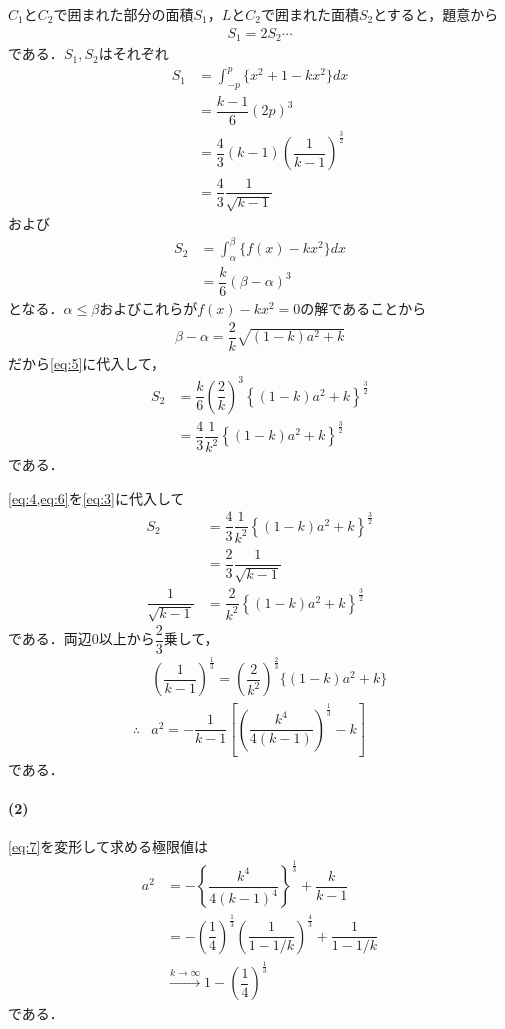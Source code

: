 \documentclass[../../main.tex]{subfiles}
\begin{document}
$C_1$と$C_2$で囲まれた部分の面積$S_1$，$L$と$C_2$で囲まれた面積$S_2$とすると，題意から
\begin{align}
  S_1 = 2S_2 \cdots \label{eq:3}
\end{align}
である．$S_1,S_2$はそれぞれ
\begin{align}
  S_1
  &= \int_{-p}^p \{ x^2+1 - kx^2 \} dx \\
  &= \dfrac{k-1}{6} (2p)^3 \\
  &= \dfrac{4}{3} (k-1) \left( \dfrac{1}{k-1} \right)^{\frac{3}{2}} \\
  &= \dfrac{4}{3} \dfrac{1}{\sqrt{k-1}} \label{eq:4}
\end{align}
および
\begin{align}
  S_2
  & = \int_\alpha^\beta \{ f(x) - kx^2 \} dx \\
  &= \dfrac{k}{6}(\beta-\alpha)^3 \label{eq:5}
\end{align}
となる．$\alpha \le \beta$およびこれらが$f(x)-kx^2=0$の解であることから
\begin{align}
  \beta - \alpha = \dfrac{2}{k}\sqrt{(1-k)a^2+k}
\end{align}
だから\cref{eq:5}に代入して，
\begin{align}
  S_2
  & = \dfrac{k}{6} \left( \dfrac{2}{k} \right)^3 \left\{ (1-k)a^2+k \right\}^{\frac{3}{2}}\\
  & = \dfrac{4}{3}\dfrac{1}{k^2} \left\{ (1-k)a^2+k \right\}^{\frac{3}{2}} \label{eq:6}
\end{align}
である．

\cref{eq:4,eq:6}を\cref{eq:3}に代入して
\begin{align}
  S_2 & = \dfrac{4}{3}\dfrac{1}{k^2} \left\{ (1-k)a^2+k \right\}^{\frac{3}{2}} \\
  & = \dfrac{2}{3} \dfrac{1}{\sqrt{k-1}} \\
  \dfrac{1}{\sqrt{k-1}} & = \dfrac{2}{k^2}\left\{ (1-k)a^2+k \right\}^{\frac{3}{2}}
\end{align}
である．両辺0以上から$\dfrac{2}{3}$乗して，
\begin{align}
  & \left(\dfrac{1}{k-1}\right)^{\frac{1}{3}} = \left(\dfrac{2}{k^2}\right)^{\frac{2}{3}} \{ (1-k)a^2+k \} \\
  \therefore
  & a^2 = - \dfrac{1}{k-1}\left[ \left(\dfrac{k^4}{4(k-1)}\right)^{\frac{1}{3}} - k \right] \label{eq:7}
\end{align}
である．

\paragraph{(2)}

\cref{eq:7}を変形して求める極限値は
\begin{align}
  a^2
  & = - \left\{ \dfrac{k^4}{4(k-1)^4} \right\}^{\frac{1}{3}} + \dfrac{k}{k-1} \\
  & = - \left( \dfrac{1}{4} \right)^{\frac{1}{3}} \left( \dfrac{1}{1-1/k} \right)^{\frac{4}{3}} + \dfrac{1}{1-1/k} \\
  & \xrightarrow{k\to\infty} 1 - \left( \dfrac{1}{4} \right)^{\frac{1}{3}}
\end{align}
である．
\end{document}
